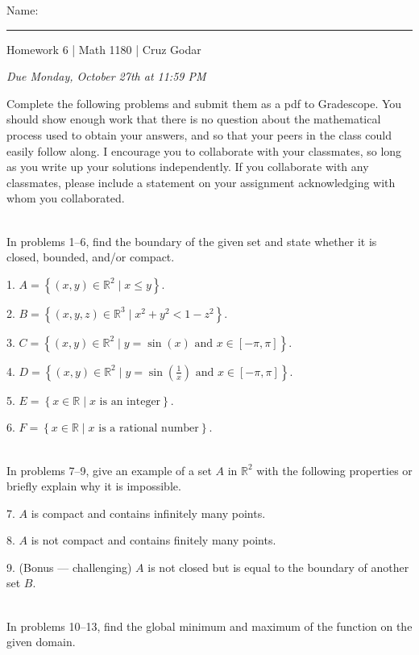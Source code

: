 \documentclass{article}
\begin{document}
\Large Name: \rule{2in}{0.15mm} \hfill Homework 6 | Math 1180 | Cruz Godar \vspace{4pt} \normalsize

\textit{Due Monday, October 27th at 11:59 PM}

Complete the following problems and submit them as a pdf to Gradescope. You should show enough work that there is no question about the mathematical process used to obtain your answers, and so that your peers in the class could easily follow along. I encourage you to collaborate with your classmates, so long as you write up your solutions independently. If you collaborate with any classmates, please include a statement on your assignment acknowledging with whom you collaborated.

~\\

In problems 1--6, find the boundary of the given set and state whether it is closed, bounded, and/or compact.

1. $A = \left\{ (x, y) \in \mathbb{R}^2 \mid x \leq y \right\}$.

2. $B = \left\{ (x, y, z) \in \mathbb{R}^3 \mid x^2 + y^2 < 1 - z^2 \right\}$.

3. $C = \left\{ (x, y) \in \mathbb{R}^2 \mid y = \sin(x) \text{ and } x \in [-\pi, \pi] \right\}$.

4. $D = \left\{ (x, y) \in \mathbb{R}^2 \mid y = \sin\left( \frac{1}{x} \right) \text{ and } x \in [-\pi, \pi] \right\}$.

5. $E = \left\{ x \in \mathbb{R} \mid x \text{ is an integer} \right\}$.

6. $F = \left\{ x \in \mathbb{R} \mid x \text{ is a rational number} \right\}$.

~\\

In problems 7--9, give an example of a set $A$ in $\mathbb{R}^2$ with the following properties or briefly explain why it is impossible.

7. $A$ is compact and contains infinitely many points.

8. $A$ is not compact and contains finitely many points.

9. (Bonus --- challenging) $A$ is not closed but is equal to the boundary of another set $B$.

~\\

In problems 10--13, find the global minimum and maximum of the function on the given domain.
\end{document}
